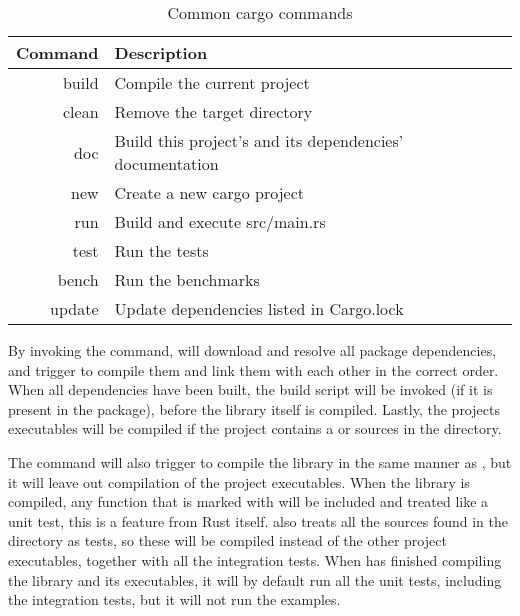 \begin{table}[ht]
\begin{center}
\begin{tabular}{r|l}
\textbf{Command} & \textbf{Description}                           \\
\hline
build  & Compile the current project                              \\
clean  & Remove the target directory                              \\
doc    & Build this project's and its dependencies' documentation \\
new    & Create a new cargo project                               \\
run    & Build and execute src/main.rs                            \\
test   & Run the tests                                            \\
bench  & Run the benchmarks                                       \\
update & Update dependencies listed in Cargo.lock                 \\
\hline
\end{tabular}
\caption{Common cargo commands}
\label{tab:common_cargo_commands}
\end{center}
\end{table}

By invoking the  command, \cargo will download and resolve all package dependencies, and trigger  to compile them and link them with each other in the correct order.
When all dependencies have been built, the build script will be invoked (if it is present in the package), before the library itself is compiled.
Lastly, the projects executables will be compiled if the project contains a  or sources in the  directory.

The  command will also trigger  to compile the library in the same manner as , but it will leave out compilation of the project executables.
When the library is compiled, any function that is marked with \attrib{\#[test]} will be included and treated like a unit test, this is a feature from Rust itself.
\cargo also treats all the sources found in the  directory as tests, so these will be compiled instead of the other project executables, together with all the integration tests.
When \cargo has finished compiling the library and its executables, it will by default run all the unit tests, including the integration tests, but it will not run the examples.

